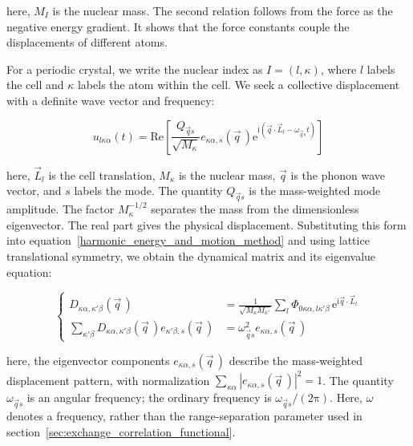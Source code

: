 here, $M_I$ is the nuclear mass.
The second relation follows from the force as the negative energy gradient.
It shows that the force constants couple the displacements of different atoms.

For a periodic crystal, we write the nuclear index as $I=(l,\kappa)$,
where $l$ labels the cell and $\kappa$ labels the atom within the cell.
We seek a collective displacement with a definite wave vector and frequency:

\begin{equation}
    u_{l\kappa\alpha}(t)
    =\mathrm{Re}\left[
    \frac{Q_{\vec{q}s}}{\sqrt{M_\kappa}}
    e_{\kappa\alpha,s}(\vec{q}\,)
    \mathrm{e}^{\mathrm{i}(\vec{q}\cdot\vec{L}_l-\omega_{\vec{q}s}t)}
    \right]
\label{phonon_normal_mode_method}
\end{equation}

here, $\vec{L}_l$ is the cell translation, $M_\kappa$ is the nuclear mass,
$\vec{q}$ is the phonon wave vector, and $s$ labels the mode.
The quantity $Q_{\vec{q}s}$ is the mass-weighted mode amplitude.
The factor $M_\kappa^{-1/2}$ separates the mass from the dimensionless eigenvector.
The real part gives the physical displacement.
Substituting this form into equation~\eqref{harmonic_energy_and_motion_method}
and using lattice translational symmetry,
we obtain the dynamical matrix and its eigenvalue equation:

\begin{equation}
\left\{\begin{aligned}
    D_{\kappa\alpha,\kappa'\beta}(\vec{q}\,)
    &=
    \frac{1}{\sqrt{M_\kappa M_{\kappa'}}}
    \sum_l\Phi_{0\kappa\alpha,l\kappa'\beta}
    \,\mathrm{e}^{\mathrm{i}\vec{q}\cdot\vec{L}_l} \\
    \sum_{\kappa'\beta}
    D_{\kappa\alpha,\kappa'\beta}(\vec{q}\,)
    e_{\kappa'\beta,s}(\vec{q}\,)
    &=\omega_{\vec{q}s}^{2}e_{\kappa\alpha,s}(\vec{q}\,)
\end{aligned}\right.
\label{phonon_dynamical_matrix_method}
\end{equation}

here, the eigenvector components $e_{\kappa\alpha,s}(\vec{q}\,)$ describe the mass-weighted displacement pattern,
with normalization $\sum_{\kappa\alpha}|e_{\kappa\alpha,s}(\vec{q}\,)|^2=1$.
The quantity $\omega_{\vec{q}s}$ is an angular frequency;
the ordinary frequency is $\omega_{\vec{q}s}/(2\mathrm{\pi})$.
Here, $\omega$ denotes a frequency, rather than the range-separation parameter used in section~\ref{sec:exchange_correlation_functional}.

